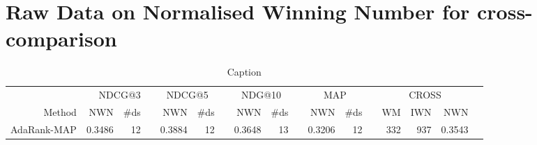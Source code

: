\documentclass{sig-alternate-2013}
\begin{document}
\section{Raw Data on Normalised Winning Number for cross-comparison}
\label{app:norm_winnum_all}
\onecolumn
\begin{table}\centering
\begin{longtable}{@{}rrrrrrrrrrrrrrrrr@{}}\toprule
& \multicolumn{2}{p{0.5cm}}{NDCG@3} & \phantom{a} 
& \multicolumn{2}{c}{NDCG@5} & \phantom{a} 
& \multicolumn{2}{c}{NDG@10} & \phantom{a} 
& \multicolumn{2}{c}{MAP}    & \phantom{a}
& \multicolumn{3}{c}{CROSS}\\
\cmidrule{2-3} \cmidrule{5-6} \cmidrule{8-9} \cmidrule{11-12} \cmidrule{14-16}
Method & NWN & \#ds && NWN & \#ds && NWN & \#ds && NWN & \#ds && WM & IWN & NWN \\ \midrule
AdaRank-MAP & 0.3486 & 12 && 0.3884 & 12 && 0.3648 & 13 && 0.3206 & 12 && 332 & 937 & 0.3543 \\
\bottomrule
\end{longtable}
\caption{Caption}
\end{table}
\end{document}
